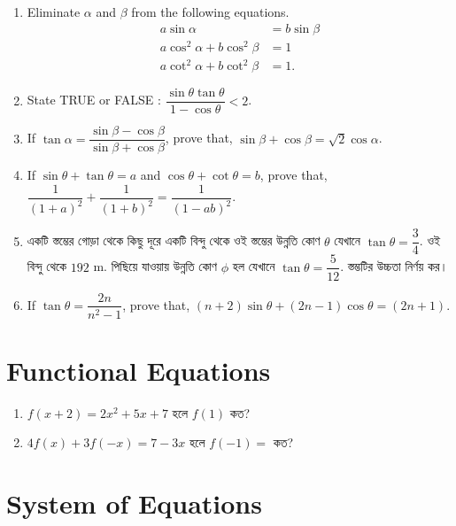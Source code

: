 \documentclass[11pt, a4paper]{article}
\begin{document}
\begin{enumerate}
	\item Eliminate $\alpha$ and $\beta$ from the following equations.
	\begin{align*}
	a \sin \alpha &= b \sin \beta \\
	a \cos^2 \alpha + b \cos^2 \beta &= 1 \\
	a \cot^2 \alpha + b \cot^2 \beta &= 1.	
	\end{align*}

	\item State TRUE or FALSE : $\dfrac{\sin \theta \tan \theta}{1 - \cos \theta} < 2$.
	
	\item If $\tan \alpha = \dfrac{\sin \beta - \cos \beta}{\sin \beta + \cos \beta}$, prove that, $\sin \beta + \cos \beta = \sqrt{2} \cos \alpha$.
	
	\item If $\sin \theta + \tan \theta = a$ and $\cos \theta + \cot \theta = b$, prove that, $\dfrac{1}{(1+a)^2} + \dfrac{1}{(1+b)^2} = \dfrac{1}{(1-ab)^2}$.
	
	\item \textbengali{একটি স্তম্ভের গোড়া থেকে কিছু দূরে একটি বিন্দু থেকে ওই স্তম্ভের উন্নতি কোণ} $\theta$ \textbengali{যেখানে} $\tan \theta = \dfrac{3}{4}$. \textbengali{ওই বিন্দু থেকে} $192$ m. \textbengali{পিছিয়ে যাওয়ায় উন্নতি কোণ} $\phi$ \textbengali{হল যেখানে} $\tan \theta = \dfrac{5}{12}$. \textbengali{স্তম্ভটির উচ্চতা নির্ণয় কর।}
	
	\item If $\tan \theta = \dfrac{2n}{n^2 - 1}$, prove that, $(n+2)\sin \theta + (2n - 1)\cos \theta = (2n+1)$.
	
	
\end{enumerate}

\section{Functional Equations}

\begin{enumerate}

	\item $ f(x+2) = 2x^2 +5x+7 $ \textbengali{হলে} $ f(1) $ \textbengali{কত}?
	

	\item $ 4f(x) + 3f(-x) = 7 - 3x $ \textbengali{হলে} $ f(-1) = $  \textbengali{কত?}

\end{enumerate}

\section{System of Equations}
\end{document}
